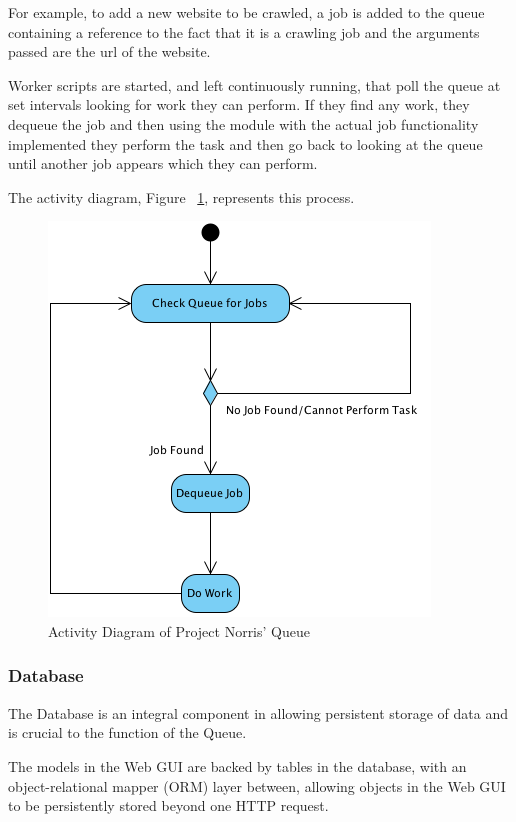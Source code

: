 \documentclass[12pt,a4paper]{article}
\begin{document}
For example, to add a new website to be crawled, a job is added to the queue containing a reference to the fact that it is a crawling job and the arguments passed are the url of the website.

Worker scripts are started, and left continuously running, that poll the queue at set intervals looking for work they can perform.  If they find any work, they dequeue the job and then using the module with the actual job functionality implemented they perform the task and then go back to looking at the queue until another job appears which they can perform.

The activity diagram, Figure ~\ref{fig:queue}, represents this process.

\begin{figure}[!ht]
    \begin{center}
        \includegraphics[scale=0.7]{images/queue_activity_diagram.png}    
    \end{center}
    \caption{Activity Diagram of Project Norris' Queue}
    \label{fig:queue}
\end{figure}

\subsubsection{Database}
The Database is an integral component in allowing persistent storage of data and is crucial to the function of the Queue. 

The models in the Web GUI are backed by tables in the database, with an object-relational mapper (ORM) layer between, allowing objects in the Web GUI to be persistently stored beyond one HTTP request.
\end{document}
